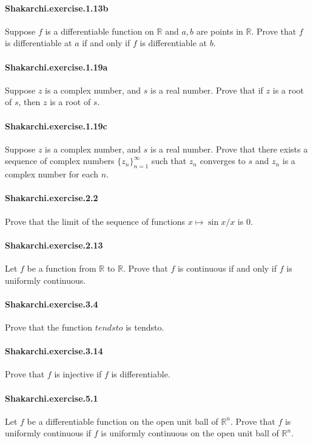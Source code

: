 \documentclass{article}
\begin{document}
\paragraph{Shakarchi.exercise.1.13b} Suppose $f$ is a differentiable function on $\mathbb{R}$ and $a, b$ are points in $\mathbb{R}$. Prove that $f$ is differentiable at $a$ if and only if $f$ is differentiable at $b$.

\paragraph{Shakarchi.exercise.1.19a} Suppose $z$ is a complex number, and $s$ is a real number. Prove that if $z$ is a root of $s$, then $z$ is a root of $s$.

\paragraph{Shakarchi.exercise.1.19c} Suppose $z$ is a complex number, and $s$ is a real number. Prove that there exists a sequence of complex numbers $\{z_n\}_{n=1}^\infty$ such that $z_n$ converges to $s$ and $z_n$ is a complex number for each $n$.

\paragraph{Shakarchi.exercise.2.2} Prove that the limit of the sequence of functions $x \mapsto \sin x / x$ is $0$.

\paragraph{Shakarchi.exercise.2.13} Let $f$ be a function from $\mathbb{R}$ to $\mathbb{R}$. Prove that $f$ is continuous if and only if $f$ is uniformly continuous.

\paragraph{Shakarchi.exercise.3.4} Prove that the function $tendsto$ is tendsto.

\paragraph{Shakarchi.exercise.3.14} Prove that $f$ is injective if $f$ is differentiable.

\paragraph{Shakarchi.exercise.5.1} Let $f$ be a differentiable function on the open unit ball of $\mathbb{R}^n$. Prove that $f$ is uniformly continuous if $f$ is uniformly continuous on the open unit ball of $\mathbb{R}^n$.
\end{document}
